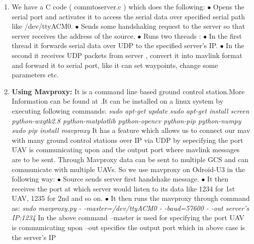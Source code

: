 \documentclass[12pt]{article}
\begin{document}
\begin{enumerate}
\item We have a C code ( commtoserver.c ) which does the following:
\subitem $\bullet$ Opens the serial port and activates it to access the serial data over specified serial path like /dev/ttyACM0.
\subitem $\bullet$ Sends some handshaking request to the server so that server receives the address of the source.
\subitem $\bullet$ Runs two threads :
\subitem $\bullet$ In the first thread it forwards serial data over UDP to the specified server's  IP.
\subitem $\bullet$ In the second it receives UDP packets from server , convert it into mavlink format and forward it to serial port, like it can set waypoints, change some parameters etc.
\item {\bf Using Mavproxy:} It is a command line based ground control station.More Information can be found at \cite{3}.It can be installed on a linux system by executing following commands:\newline
\newline
\textit{sudo apt-get update}\newline
\textit{sudo apt-get install screen python-wxgtk2.8 python-matplotlib python-opencv python-pip python-numpy}\newline
\textit{sudo pip install mavproxy}\newline\newline
It has a feature which allows us to connect our mav with many ground control stations over IP via UDP by sepecifying the port
UAV is communicating upon and the output port where mavlink messages are to be sent. Through Mavproxy data can be sent to multiple GCS and can communicate with multiple UAVs.\newline
So we use mavproxy on Odroid-U3 in the following way:
\subitem $\bullet$ Source sends server first handshake message.
\subitem $\bullet$ It then receives the port at which server would listen to its data like 1234 for 1st UAV, 1235 for 2nd and so on.
\subitem $\bullet$ It then runs the mavproxy through command as:\newline\newline
\hspace*{-50px}\textit {sudo mavproxy.py  - -master=/dev/ttyACM0  - -baud=57600  - -out server's IP:1234 }\newline\newline
In the above command --master is used for specifying the port UAV is communicating upon --out specifies the output port which in above case is the server's IP
\end{enumerate} 
\end{document}
